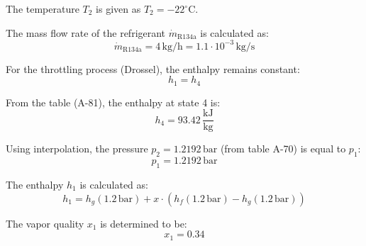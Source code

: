 The temperature \( T_2 \) is given as \( T_2 = -22^\circ\text{C} \).  

The mass flow rate of the refrigerant \( \dot{m}_{\text{R134a}} \) is calculated as:  
\[
\dot{m}_{\text{R134a}} = 4 \, \text{kg/h} = 1.1 \cdot 10^{-3} \, \text{kg/s}
\]

For the throttling process (Drossel), the enthalpy remains constant:  
\[
h_1 = h_4
\]

From the table (A-81), the enthalpy at state 4 is:  
\[
h_4 = 93.42 \, \frac{\text{kJ}}{\text{kg}}
\]

Using interpolation, the pressure \( p_2 = 1.2192 \, \text{bar} \) (from table A-70) is equal to \( p_1 \):  
\[
p_1 = 1.2192 \, \text{bar}
\]

The enthalpy \( h_1 \) is calculated as:  
\[
h_1 = h_g(1.2 \, \text{bar}) + x \cdot \left( h_f(1.2 \, \text{bar}) - h_g(1.2 \, \text{bar}) \right)
\]

The vapor quality \( x_1 \) is determined to be:  
\[
x_1 = 0.34
\]